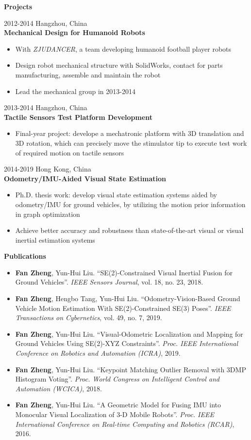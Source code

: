 \documentclass[11pt]{article}
\newcommand{\subsec}[1]{
  \vskip 4pt
  {\bf\large\color{teal}  #1}
  \vskip 1pt
}
\newcommand{\yearspaceevent}[3]{
  {\color{gray} \small #1 \hfill #2}\\
  {\bf #3}
}
\begin{document}
\begin{minipage}[t]{0.6\textwidth}
  \subsec{Projects}
  \yearspaceevent{2012-2014}{Hangzhou, China}{Mechanical Design for Humanoid Robots}
  \begin{itemize}
    \item With \emph{ZJUDANCER}, a team developing humanoid football player robots
    \item Design robot mechanical structure with SolidWorks, contact for parts manufacturing, assemble and maintain the robot
    \item Lead the mechanical group in 2013-2014
  \end{itemize}
  \yearspaceevent{2013-2014}{Hangzhou, China}{Tactile Sensors Test Platform Development}
  \begin{itemize}
    \item Final-year project: develope a mechatronic platform with 3D translation and 3D rotation, which can
      precisely move the stimulator tip to execute test work of required motion on tactile sensors
  \end{itemize}
  \yearspaceevent{2014-2019}{Hong Kong, China}{Odometry/IMU-Aided Visual State Estimation}
  \begin{itemize}
    \item Ph.D. thesis work: develop visual state estimation systems aided by odometry/IMU for ground vehicles, by utilizing the motion prior information in graph optimization
    \item Achieve better accuracy and robustness than state-of-the-art visual or visual inertial estimation systems
  \end{itemize}

  \subsec{Publications}

  \begin{itemize}
    \item {\bf Fan Zheng}, Yun-Hui Liu. ``SE(2)-Constrained Visual Inertial Fusion for Ground Vehicles''. {\it IEEE Sensors Journal}, vol. 18, no. 23, 2018.
    \item {\bf Fan Zheng}, Hengbo Tang, Yun-Hui Liu. ``Odometry-Vision-Based Ground Vehicle Motion Estimation With SE(2)-Constrained SE(3) Poses''. {\it IEEE Transactions on Cybernetics}, vol. 49, no. 7, 2019.
    \item {\bf Fan Zheng}, Yun-Hui Liu. ``Visual-Odometric Localization and Mapping for Ground Vehicles Using SE(2)-XYZ Constraints''. {\it Proc. IEEE International Conference on Robotics and Automation (ICRA)}, 2019.
    \item {\bf Fan Zheng}, Yun-Hui Liu. ``Keypoint Matching Outlier Removal with 3DMP Histogram Voting''. {\it Proc. World Congress on Intelligent Control and Automation (WCICA)}, 2018.
    \item {\bf Fan Zheng}, Yun-Hui Liu. ``A Geometric Model for Fusing IMU into Monocular Visual Localization of 3-D Mobile Robots''. {\it Proc. IEEE International Conference on Real-time Computing and Robotics (RCAR)}, 2016.
  \end{itemize}

\end{minipage}
\end{document}
